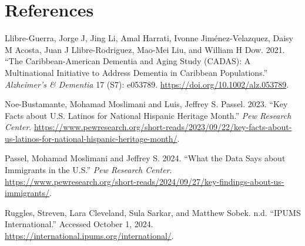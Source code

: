 \documentclass[
]{article}
\newlength{\cslhangindent}
\newenvironment{CSLReferences}[2] %
 {\begin{list}{}{%
  \setlength{\itemindent}{0pt}
  \setlength{\leftmargin}{0pt}
  \setlength{\parsep}{0pt}
  \ifodd #1
   \setlength{\leftmargin}{\cslhangindent}
   \setlength{\itemindent}{-1\cslhangindent}
  \fi
  \setlength{\itemsep}{#2\baselineskip}}}
 {\end{list}}
\begin{document}
\section*{References}\label{references}

\label{refs}
\begin{CSLReferences}{1}{0}
Llibre-Guerra, Jorge J, Jing Li, Amal Harrati, Ivonne Jiménez-Velazquez,
Daisy M Acosta, Juan J Llibre-Rodriguez, Mao-Mei Liu, and William H Dow.
2021. {``The {Caribbean}-{American} {Dementia} and {Aging} {Study}
({CADAS}): {A} Multinational Initiative to Address Dementia in
{Caribbean} Populations.''} \emph{Alzheimer's \& Dementia} 17 (S7):
e053789. \url{https://doi.org/10.1002/alz.053789}.

Noe-Bustamante, Mohamad Moslimani and Luis, Jeffrey S. Passel. 2023.
{``Key Facts about {U}.{S}. {Latinos} for {National} {Hispanic}
{Heritage} {Month}.''} \emph{Pew Research Center}.
\url{https://www.pewresearch.org/short-reads/2023/09/22/key-facts-about-us-latinos-for-national-hispanic-heritage-month/}.

Passel, Mohamad Moslimani and Jeffrey S. 2024. {``What the Data Says
about Immigrants in the {U}.{S}.''} \emph{Pew Research Center}.
\url{https://www.pewresearch.org/short-reads/2024/09/27/key-findings-about-us-immigrants/}.

Ruggles, Streven, Lara Cleveland, Sula Sarkar, and Matthew Sobek. n.d.
{``{IPUMS} {International}.''} Accessed October 1, 2024.
\url{https://international.ipums.org/international/}.

\end{CSLReferences}
\end{document}

